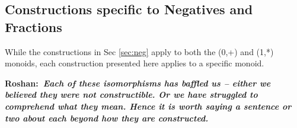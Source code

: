 \documentclass[preprint]{sigplanconf}
\newcommand{\xcomment}[2]{\textbf{#1:~\textsl{#2}}}
\newcommand{\roshan}[1]{\xcomment{Roshan}{#1}}
\newcommand{\lcal}{\ensuremath{\lambda}-calculus\xspace}
\begin{document}

\subsection{Constructions specific to Negatives and Fractions}
\label{sec:specific-constructions}

While the constructions in Sec \ref{sec:neg} apply to both the
{{(0,+)}} and {{(1,*)}} monoids, each construction presented here
applies to a specific monoid.

\roshan{Each of these isomorphisms has baffled us -- either we
  believed they were not constructible. Or we have struggled to
  comprehend what they mean. Hence it is worth saying a sentence or
  two about each beyond how they are constructed.}
\end{document}
